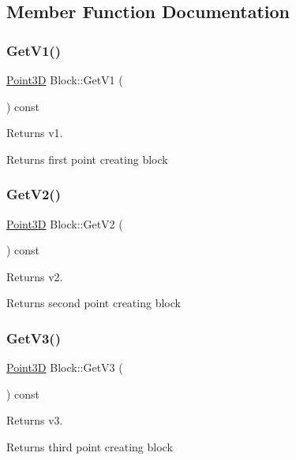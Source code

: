 \subsection{Member Function Documentation}
\hypertarget{class_block_aaa48ffa0a41fafeb85fb05ad856dbcfe}{}\label{class_block_aaa48ffa0a41fafeb85fb05ad856dbcfe} 
\subsubsection{\texorpdfstring{Get\+V1()}{GetV1()}}
{\footnotesize\ttfamily \hyperlink{class_point3_d}{Point3D} Block\+::\+Get\+V1 (\begin{DoxyParamCaption}{ }\end{DoxyParamCaption}) const}

Returns v1. \begin{DoxyReturn}{Returns}
first point creating block 
\end{DoxyReturn}
\hypertarget{class_block_aa5050e8dd9b471e1d6844e075d5c6171}{}\label{class_block_aa5050e8dd9b471e1d6844e075d5c6171} 
\subsubsection{\texorpdfstring{Get\+V2()}{GetV2()}}
{\footnotesize\ttfamily \hyperlink{class_point3_d}{Point3D} Block\+::\+Get\+V2 (\begin{DoxyParamCaption}{ }\end{DoxyParamCaption}) const}

Returns v2. \begin{DoxyReturn}{Returns}
second point creating block 
\end{DoxyReturn}
\hypertarget{class_block_af163578ec4cec1fdea035df72812f95b}{}\label{class_block_af163578ec4cec1fdea035df72812f95b} 
\subsubsection{\texorpdfstring{Get\+V3()}{GetV3()}}
{\footnotesize\ttfamily \hyperlink{class_point3_d}{Point3D} Block\+::\+Get\+V3 (\begin{DoxyParamCaption}{ }\end{DoxyParamCaption}) const}

Returns v3. \begin{DoxyReturn}{Returns}
third point creating block 
\end{DoxyReturn}
\hypertarget{class_block_a288e90a1b2e3fe8fb111e45fc93ab75b}{}\label{class_block_a288e90a1b2e3fe8fb111e45fc93ab75b} 
